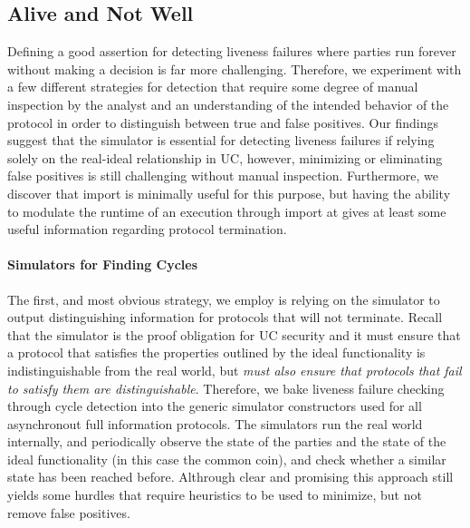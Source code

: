 \subsection{Alive and Not Well}
Defining a good assertion for detecting liveness failures where parties run forever without making a decision is far more challenging.
Therefore, we experiment with a few different strategies for detection that require some degree of manual inspection by the analyst and an understanding of the intended behavior of the protocol in order to distinguish between true and false positives. 
Our findings suggest that the simulator is essential for detecting liveness failures if relying solely on the real-ideal relationship in UC, however, minimizing or eliminating false positives is still challenging without manual inspection.
Furthermore, we discover that import is minimally useful for this purpose, but having the ability to modulate the runtime of an execution through import at gives at least some useful information regarding protocol termination.


\paragraph{Simulators for Finding Cycles}
The first, and most obvious strategy, we employ is relying on the simulator to output distinguishing information for protocols that will not terminate.
Recall that the simulator is the proof obligation for UC security and it must ensure that a protocol that satisfies the properties outlined by the ideal functionality is indistinguishable from the real world, but \emph{must also ensure that protocols that fail to satisfy them are distinguishable}. 
Therefore, we bake liveness failure checking through cycle detection into the generic simulator constructors used for all asynchronout full information protocols.
The simulators run the real world internally, and periodically observe the state of the parties and the state of the ideal functionality (in this case the common coin), and check whether a similar state has been reached before. 
Althrough clear and promising this approach still yields some hurdles that require heuristics to be used to minimize, but not remove false positives.

